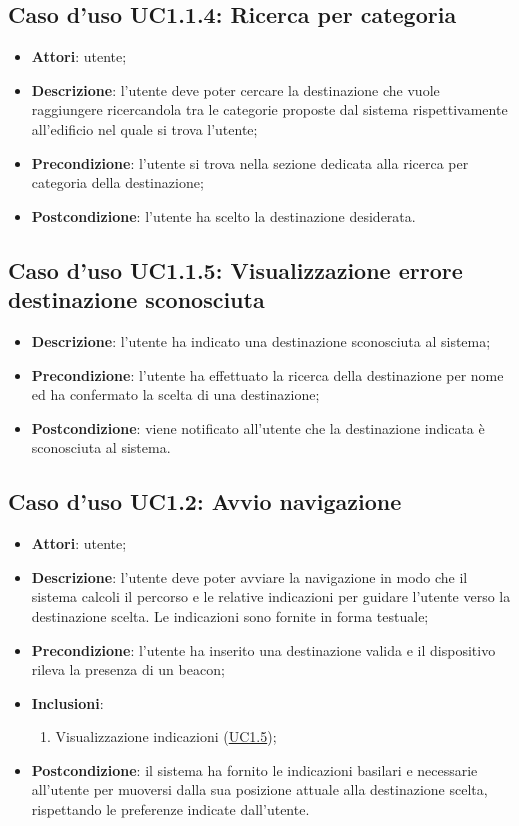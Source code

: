 \documentclass[../AnalisiDeiRequisiti.tex]{subfiles}
\begin{document}
\subsection{Caso d'uso UC1.1.4: Ricerca per categoria}
\begin{itemize}
\item \textbf{Attori}: utente;
\item \textbf{Descrizione}: l'utente deve poter cercare la destinazione che vuole raggiungere ricercandola tra le categorie proposte dal sistema rispettivamente all'edificio nel quale si trova l'utente; 
      \item \textbf{Precondizione}: l'utente si trova nella sezione dedicata alla ricerca per categoria della destinazione;
    \item \textbf{Postcondizione}: l'utente ha scelto la destinazione desiderata.
  \end{itemize}
\hypertarget{UC1.1.5}{}
\subsection{Caso d'uso UC1.1.5: Visualizzazione errore destinazione sconosciuta}
\begin{itemize}
\item \textbf{Descrizione}: l'utente ha indicato una destinazione sconosciuta al sistema; 
      \item \textbf{Precondizione}: l'utente ha effettuato la ricerca della destinazione per nome ed ha confermato la scelta di una destinazione;
    \item \textbf{Postcondizione}: viene notificato all'utente che la destinazione indicata è sconosciuta al sistema.
  \end{itemize}
\hypertarget{UC1.2}{}
\subsection{Caso d'uso UC1.2: Avvio navigazione}
\begin{itemize}
\item \textbf{Attori}: utente;
\item \textbf{Descrizione}: l'utente deve poter avviare la navigazione in modo che il sistema calcoli il percorso e le relative indicazioni per guidare l'utente verso la destinazione scelta. Le indicazioni sono fornite in forma testuale; 
      \item \textbf{Precondizione}: l'utente ha inserito una destinazione valida e il dispositivo rileva la presenza di un beacon;
    \item \textbf{Inclusioni}:
      \begin{enumerate}
          \item Visualizzazione indicazioni (\hyperlink{UC1.5}{UC1.5});

      \end{enumerate}
    \item \textbf{Postcondizione}: il sistema ha fornito le indicazioni basilari  e necessarie all'utente per muoversi dalla sua posizione attuale alla destinazione scelta, rispettando le preferenze indicate dall'utente.
  \end{itemize}
\hypertarget{UC1.3}{}
\end{document}
